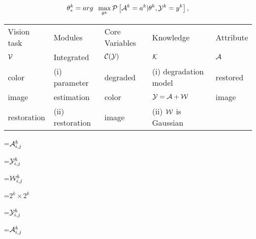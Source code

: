 {\newpage
\clearpage
\samepage \begin{equation}%
\theta^k_*= arg\;\; \max_{\theta^k} \P \left [
\X^k=\x^k | \theta^k, \Y^k=y^k \right ],
\label{eq:un_sup_parameter}
\end{equation}
}

{\newpage
\clearpage
\samepage \begin{table}\begin{center}
 
\begin{tabular}{||l||l|l|l|l||} \hline \hline
Vision task & Modules  & Core Variables & Knowledge & Attribute  \\  
 ${\cal{V}}$            & Integrated & ${\cal{C(Y)}}$  &    ${\cal{K}}$       & ${\cal{A}}$ \\  \hline
\hline
color & (i) parameter  & degraded  & (i) degradation model& restored \\ 
image & estimation & color & ${\cal{Y}}
  = {\cal{A}}
  + {\cal{W}}$& image\\   
restoration & (ii) restoration &image & (ii) ${\cal{W}}$ is Gaussian & \\   
\hline
\hline
\end{tabular}
\end{center}
 

\label{tab:gen_cir}
\end{table}
}

{\newpage
\clearpage
\samepage \setbox\sizebox=\hbox{${\cal{A}}
 ^{k}_{i,j}$}\box\sizebox
}

{\newpage
\clearpage
\samepage \setbox\sizebox=\hbox{${\cal{Y}}
 ^{k}_{i,j}$}\box\sizebox
}

{\newpage
\clearpage
\samepage \setbox\sizebox=\hbox{${\cal{W}}
 ^{k}_{i,j}$}\box\sizebox
}

{\newpage
\clearpage
\samepage \setbox\sizebox=\hbox{$2^{k} \times 2^{k}$}\box\sizebox
}

{\newpage
\clearpage
\samepage \setbox\sizebox=\hbox{${\cal{Y}}
 ^{k}_{i,j}$}\box\sizebox
}

{\newpage
\clearpage
\samepage \setbox\sizebox=\hbox{${\cal{A}}
 ^{k}_{i,j}$}\box\sizebox
}

